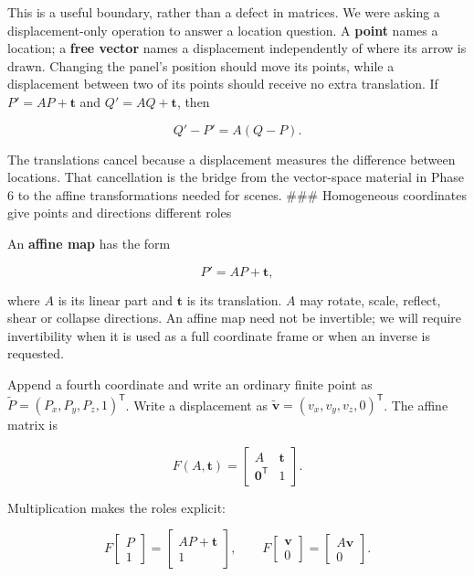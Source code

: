 This is a useful boundary, rather than a defect in matrices. We were asking a displacement-only operation to answer a location question. A \textbf{point} names a location; a \textbf{free vector} names a displacement independently of where its arrow is drawn. Changing the panel's position should move its points, while a displacement between two of its points should receive no extra translation. If \(P'=AP+\mathbf t\) and \(Q'=AQ+\mathbf t\), then

\[
Q'-P'=A(Q-P).
\]

The translations cancel because a displacement measures the difference between locations. That cancellation is the bridge from the vector-space material in Phase 6 to the affine transformations needed for scenes. \#\#\# Homogeneous coordinates give points and directions different roles

An \textbf{affine map} has the form

\[
P'=AP+\mathbf t,
\]

where \(A\) is its linear part and \(\mathbf t\) is its translation. \(A\) may rotate, scale, reflect, shear or collapse directions. An affine map need not be invertible; we will require invertibility when it is used as a full coordinate frame or when an inverse is requested.

Append a fourth coordinate and write an ordinary finite point as \(\widetilde P=(P_x,P_y,P_z,1)^{\mathsf T}\). Write a displacement as \(\widetilde{\mathbf v}=(v_x,v_y,v_z,0)^{\mathsf T}\). The affine matrix is

\[
F(A,\mathbf t)=
\begin{bmatrix}
A&\mathbf t\\
\mathbf0^{\mathsf T}&1
\end{bmatrix}.
\]

Multiplication makes the roles explicit:

\[
F\begin{bmatrix}P\\1\end{bmatrix}
=\begin{bmatrix}AP+\mathbf t\\1\end{bmatrix},
\qquad
F\begin{bmatrix}\mathbf v\\0\end{bmatrix}
=\begin{bmatrix}A\mathbf v\\0\end{bmatrix}.
\]

